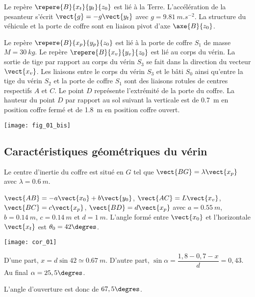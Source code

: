 Le repère $\repere{B}{x_t}{y_t}{z_0}$ est lié à la Terre. L’accélération de la pesanteur s’écrit $\vect{g}=-g\vect{y_t}$ avec $g=\SI{9,81}{m.s^{-2}}$. La structure du véhicule et la porte de coffre sont en liaison pivot d’axe $\axe{B}{z_0}$.

Le repère $\repere{B}{x_p}{y_p}{z_0}$ est lié à la porte de coffre \textbf{${S_1}$} de masse $M=\SI{30}{kg}$. Le repère $\repere{B}{x_v}{y_v}{z_0}$ est lié au corps du vérin. La sortie
de tige par rapport au corps du vérin \textbf{$S_3$} se fait dans la direction du vecteur $\vect{x_v}$.
Les liaisons entre le corps du vérin \textbf{${S_3}$} et le bâti \textbf{${S_0}$} ainsi qu'entre la tige du vérin \textbf{${S_2}$} et la porte de coffre \textbf{${S_1}$} sont des liaisons rotules de centres respectifs $A$ et $C$.
Le point $D$ représente l’extrémité de la porte du coffre. La hauteur du point $D$ par rapport au sol suivant la
verticale est de \SI{0,7}{m} en position coffre fermé et de \SI{1,8}{m} en position coffre ouvert.


\begin{marginfigure}
\texttt{[image: fig\_01\_bis]}
\end{marginfigure}
\fi


\subsection*{Caractéristiques géométriques du vérin}
\ifprof
\else
Le centre d’inertie du coffre est situé en $G$ tel que $\vect{BG}=\lambda\vect{x_p}$ avec $\lambda=\SI{0,6}{m}$.

$\vect{AB}=-a\vect{x_0}+b\vect{y_0}$, $\vect{AC}=L\vect{x_v}$, $\vect{BC}=c\vect{x_p}$, $\vect{BD}=d\vect{x_p}$ avec $a=\SI{0,55}{m}$, $b=\SI{0,14}{m}$, $c=\SI{0,14}{m}$  et $d=\SI{1}{m}$. L’angle formé entre $\vect{x_0}$ et l’horizontale $\vect{x_t}$ est $\theta_0 = 42\degres$.
\fi

\ifprof
\begin{corrige}
\begin{center}
\texttt{[image: cor\_01]}
\end{center}
D'une part, $x = d\sin 42 \simeq \SI{0,67}{m}$. D'autre part, $\sin\alpha = \dfrac{1,8-0,7-x}{d}=0,43$. Au final $\alpha = 25,5\degres$. 

L'angle d'ouverture est donc de $67,5\degres$.

\end{corrige}
\else
\fi

